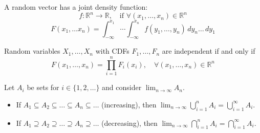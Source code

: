 \begin{definition}
    A random vector has a joint density function:
    \[f: \mathbb{R}^n \to \mathbb{R}, \quad \text{if }\forall(x_1, \dots, x_n)\in \mathbb{R}^n\]
    \[F(x_1, \dots x_n) = \int_{-\infty}^{x_1}\cdots \int_{-\infty}^{x_n}f(y_1, \dots, y_n)\, dy_n\dots \,dy_1\]
\end{definition}

\begin{theorem}
    Random variables $X_1, \dots, X_n$ with CDFs $F_1, \dots, F_n$
    are independent if and only if
    \[F(x_1, \dots, x_n) = \prod_{i=1}^nF_i(x_i), \quad \forall(x_1, \dots, x_n) \in \mathbb{R}^n \]
\end{theorem}

Let $A_i$ be sets for $i\in\{1,2,\dots\}$ and consider $\displaystyle\lim_{n\to\infty}A_n$.
\begin{itemize}
    \item If $A_1 \subseteq A_2 \subseteq \dots \subseteq A_n \subseteq \dots$ (increasing), then $\displaystyle\lim_{n\to\infty}\bigcup_{i=1}^{n}A_i = \bigcup_{i=1}^{\infty}A_i$.
    \item If $A_1 \supseteq A_2 \supseteq \dots \supseteq A_n \supseteq \dots$ (decreasing), then $\displaystyle\lim_{n\to\infty}\bigcap_{i=1}^{n}A_i = \bigcap_{i=1}^{\infty}A_i$.
\end{itemize}

